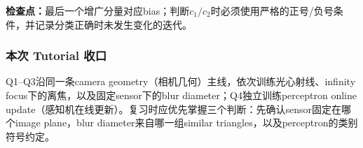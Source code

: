 \textbf{检查点：}最后一个增广分量对应bias；判断$c_1/c_2$时必须使用严格的正号/负号条件，并记录分类正确时未发生变化的迭代。

\subsubsection*{本次 Tutorial 收口}

Q1--Q3沿同一条camera geometry（相机几何）主线，依次训练光心射线、infinity focus下的离焦，以及固定sensor下的blur diameter；Q4独立训练perceptron online update（感知机在线更新）。复习时应优先掌握三个判断：先确认sensor固定在哪个image plane，blur diameter来自哪一组similar triangles，以及perceptron的类别符号约定。
